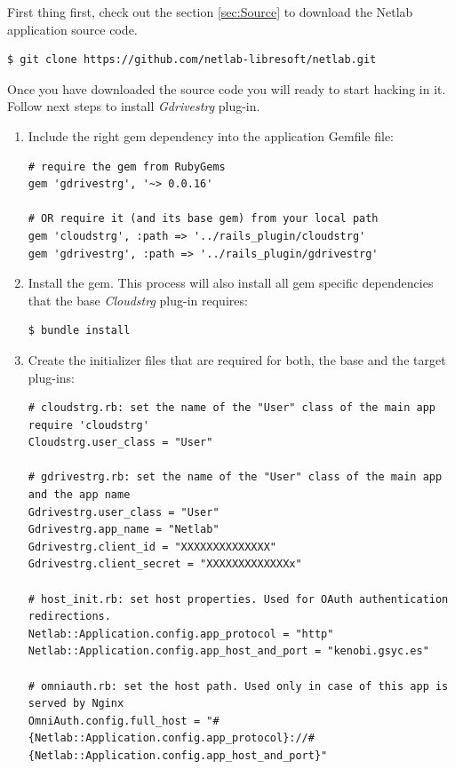 \documentclass{article}
\begin{document}
First thing first, check out the section \ref{sec:Source} to download the Netlab application source code.

\begin{verbatim}
$ git clone https://github.com/netlab-libresoft/netlab.git
\end{verbatim}

Once you have downloaded the source code you will ready to start hacking in it. Follow next steps to install \textit{Gdrivestrg} plug-in.

\begin{enumerate}
\item Include the right gem dependency into the application Gemfile file:

\begin{verbatim}
# require the gem from RubyGems
gem 'gdrivestrg', '~> 0.0.16'

# OR require it (and its base gem) from your local path
gem 'cloudstrg', :path => '../rails_plugin/cloudstrg'
gem 'gdrivestrg', :path => '../rails_plugin/gdrivestrg'
\end{verbatim}

\item Install the gem. This process will also install all gem specific dependencies that the base \textit{Cloudstrg} plug-in requires:
\begin{verbatim}
$ bundle install
\end{verbatim}

\item Create the initializer files that are required for both, the base and the target plug-ins:
\begin{verbatim}
# cloudstrg.rb: set the name of the "User" class of the main app
require 'cloudstrg'
Cloudstrg.user_class = "User"

# gdrivestrg.rb: set the name of the "User" class of the main app and the app name
Gdrivestrg.user_class = "User"
Gdrivestrg.app_name = "Netlab"
Gdrivestrg.client_id = "XXXXXXXXXXXXXX"
Gdrivestrg.client_secret = "XXXXXXXXXXXXXx"

# host_init.rb: set host properties. Used for OAuth authentication redirections.
Netlab::Application.config.app_protocol = "http"
Netlab::Application.config.app_host_and_port = "kenobi.gsyc.es"

# omniauth.rb: set the host path. Used only in case of this app is served by Nginx
OmniAuth.config.full_host = "#{Netlab::Application.config.app_protocol}://#{Netlab::Application.config.app_host_and_port}"
\end{verbatim}


\end{enumerate}
\end{document}
